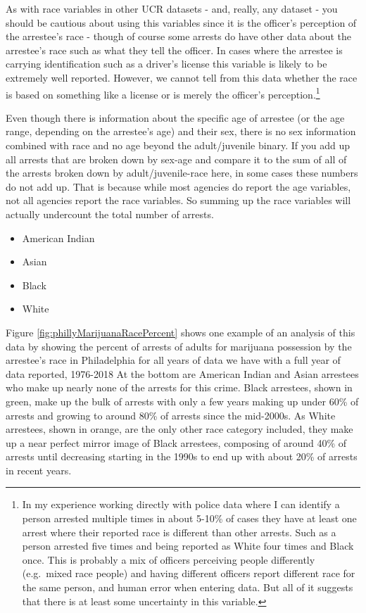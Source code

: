 \documentclass[
]{krantz}
\providecommand{\tightlist}{%
  \setlength{\itemsep}{0pt}\setlength{\parskip}{0pt}}
\begin{document}
As with race variables in other UCR datasets - and, really,
any dataset - you should be cautious about using this
variables since it is the officer's perception of the
arrestee's race - though of course some arrests do have
other data about the arrestee's race such as what they tell
the officer. In cases where the arrestee is carrying
identification such as a driver's license this variable is
likely to be extremely well reported. However, we cannot
tell from this data whether the race is based on something
like a license or is merely the officer's
perception.\footnote{In my experience working directly with
  police data where I can identify a person arrested
  multiple times in about 5-10\% of cases they have at least
  one arrest where their reported race is different than
  other arrests. Such as a person arrested five times and
  being reported as White four times and Black once. This is
  probably a mix of officers perceiving people differently
  (e.g.~mixed race people) and having different officers
  report different race for the same person, and human error
  when entering data. But all of it suggests that there is
  at least some uncertainty in this variable.}

Even though there is information about the specific age of
arrestee (or the age range, depending on the arrestee's age)
and their sex, there is no sex information combined with
race and no age beyond the adult/juvenile binary. If you add
up all arrests that are broken down by sex-age and compare
it to the sum of all of the arrests broken down by
adult/juvenile-race here, in some cases these numbers do not
add up. That is because while most agencies do report the
age variables, not all agencies report the race variables.
So summing up the race variables will actually undercount
the total number of arrests.

\begin{itemize}
\tightlist
\item
  American Indian
\item
  Asian
\item
  Black
\item
  White
\end{itemize}

Figure \ref{fig:phillyMarijuanaRacePercent} shows one
example of an analysis of this data by showing the percent
of arrests of adults for marijuana possession by the
arrestee's race in Philadelphia for all years of data we
have with a full year of data reported, 1976-2018 At the
bottom are American Indian and Asian arrestees who make up
nearly none of the arrests for this crime. Black arrestees,
shown in green, make up the bulk of arrests with only a few
years making up under 60\% of arrests and growing to around
80\% of arrests since the mid-2000s. As White arrestees,
shown in orange, are the only other race category included,
they make up a near perfect mirror image of Black arrestees,
composing of around 40\% of arrests until decreasing
starting in the 1990s to end up with about 20\% of arrests
in recent years.
\end{document}

